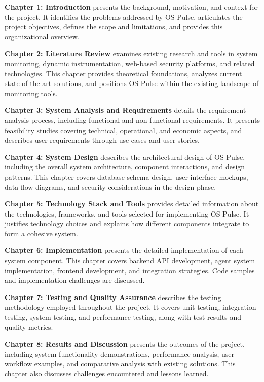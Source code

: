 \textbf{Chapter 1: Introduction} presents the background, motivation, and context for the project. It identifies the problems addressed by OS-Pulse, articulates the project objectives, defines the scope and limitations, and provides this organizational overview.

\textbf{Chapter 2: Literature Review} examines existing research and tools in system monitoring, dynamic instrumentation, web-based security platforms, and related technologies. This chapter provides theoretical foundations, analyzes current state-of-the-art solutions, and positions OS-Pulse within the existing landscape of monitoring tools.

\textbf{Chapter 3: System Analysis and Requirements} details the requirement analysis process, including functional and non-functional requirements. It presents feasibility studies covering technical, operational, and economic aspects, and describes user requirements through use cases and user stories.

\textbf{Chapter 4: System Design} describes the architectural design of OS-Pulse, including the overall system architecture, component interactions, and design patterns. This chapter covers database schema design, user interface mockups, data flow diagrams, and security considerations in the design phase.

\textbf{Chapter 5: Technology Stack and Tools} provides detailed information about the technologies, frameworks, and tools selected for implementing OS-Pulse. It justifies technology choices and explains how different components integrate to form a cohesive system.

\textbf{Chapter 6: Implementation} presents the detailed implementation of each system component. This chapter covers backend API development, agent system implementation, frontend development, and integration strategies. Code samples and implementation challenges are discussed.

\textbf{Chapter 7: Testing and Quality Assurance} describes the testing methodology employed throughout the project. It covers unit testing, integration testing, system testing, and performance testing, along with test results and quality metrics.

\textbf{Chapter 8: Results and Discussion} presents the outcomes of the project, including system functionality demonstrations, performance analysis, user workflow examples, and comparative analysis with existing solutions. This chapter also discusses challenges encountered and lessons learned.


